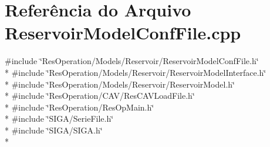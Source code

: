 \section{Referência do Arquivo Reservoir\+Model\+Conf\+File.\+cpp}
\label{_reservoir_model_conf_file_8cpp}
{\ttfamily \#include \char`\"{}Res\+Operation/\+Models/\+Reservoir/\+Reservoir\+Model\+Conf\+File.\+h\char`\"{}}\\*
{\ttfamily \#include \char`\"{}Res\+Operation/\+Models/\+Reservoir/\+Reservoir\+Model\+Interface.\+h\char`\"{}}\\*
{\ttfamily \#include \char`\"{}Res\+Operation/\+Models/\+Reservoir/\+Reservoir\+Model.\+h\char`\"{}}\\*
{\ttfamily \#include \char`\"{}Res\+Operation/\+C\+A\+V/\+Res\+C\+A\+V\+Load\+File.\+h\char`\"{}}\\*
{\ttfamily \#include \char`\"{}Res\+Operation/\+Res\+Op\+Main.\+h\char`\"{}}\\*
{\ttfamily \#include \char`\"{}S\+I\+G\+A/\+Serie\+File.\+h\char`\"{}}\\*
{\ttfamily \#include \char`\"{}S\+I\+G\+A/\+S\+I\+G\+A.\+h\char`\"{}}\\*
